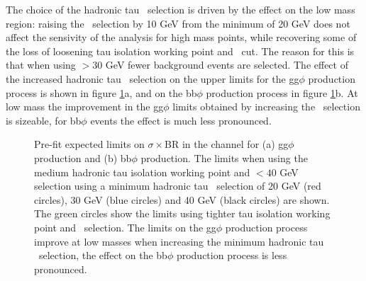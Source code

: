 The choice of the hadronic tau \pT~selection is driven by the effect on the low mass region:
raising the \pT~selection by 10 GeV from the minimum of 20 GeV does not affect the sensivity
of the analysis for high mass points, while recovering some of the loss of loosening 
tau isolation working point and \mT~cut. The reason for this is that when using \pT$>30$ GeV 
fewer background events are selected. The effect of the increased hadronic tau \pT~selection on the 
upper limits for the gg$\phi$ production process is shown
in figure \ref{fig:mssm_tauptcut}a, and on the bb$\phi$ production process
in figure \ref{fig:mssm_tauptcut}b. At low mass the improvement in the gg$\phi$ limits
obtained by increasing the \pT~selection is sizeable, for bb$\phi$ events the effect is much
less pronounced.

\begin{figure}[h!]
\begin{center}
\end{center}
\caption{Pre-fit expected limits on $\sigma\times$BR in the \mutau channel for (a) gg$\phi$ production and (b) bb$\phi$ production. The
limits when using the medium hadronic tau isolation working point and \mT$<40$ GeV selection using a minimum
hadronic tau \pT~selection of 20 GeV (red circles), 30 GeV (blue circles) and 40 GeV (black circles) are shown. The green
circles show the limits using tighter tau isolation working point and \mT~selection. The limits on
the gg$\phi$ production process improve at low masses when increasing the minimum hadronic tau \pT~selection,
the effect on the bb$\phi$ production process is less pronounced.}
\label{fig:mssm_tauptcut}
\end{figure}

